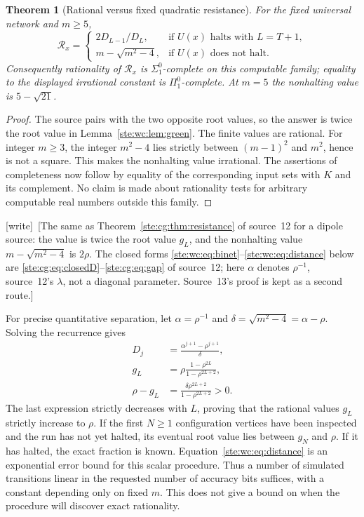 \documentclass[11pt,letterpaper]{article}
\newtheorem{theorem}{Theorem}[section]
\theoremstyle{definition}
\theoremstyle{remark}
\newcommand{\wtag}{\textup{[write]}}
\begin{document}
\begin{theorem}[Rational versus fixed quadratic resistance]
\label{ste:wc:thm:resistance}
For the fixed universal network and $m\geq5$,
\begin{equation}\label{ste:wc:eq:resistance}
 \mathcal R_x=
 \begin{cases}
  2D_{L-1}/D_L,&\text{if }U(x)\text{ halts with }L=T+1,\\
  m-\sqrt{m^2-4},&\text{if }U(x)\text{ does not halt}.
 \end{cases}
\end{equation}
Consequently rationality of $\mathcal R_x$ is $\Sigma^0_1$-complete on this
computable family; equality to the displayed irrational constant is
$\Pi^0_1$-complete. At $m=5$ the nonhalting value is $5-\sqrt{21}$.
\end{theorem}
\begin{proof}
The source pairs with the two opposite root values, so the answer is twice
the root value in Lemma~\ref{ste:wc:lem:green}. The finite values are rational. For
integer $m\geq3$, the integer $m^2-4$ lies strictly between $(m-1)^2$ and
$m^2$, hence is not a square. This makes the nonhalting value irrational.
The assertions of completeness now follow by equality of the corresponding
input sets with $K$ and its complement. No claim is made about rationality
tests for arbitrary computable real numbers outside this family.
\end{proof}

\wtag\ [The same as Theorem~\ref{ste:cg:thm:resistance} of source~12 for a dipole source: the value is twice the root value $g_L$, and the nonhalting value $m-\sqrt{m^2-4}$ is $2\rho$. The closed forms \eqref{ste:wc:eq:binet}--\eqref{ste:wc:eq:distance} below are \eqref{ste:cg:eq:closedD}--\eqref{ste:cg:eq:gap} of source~12; here $\alpha$ denotes $\rho^{-1}$, source~12's $\lambda$, not a diagonal parameter. Source~13's proof is kept as a second route.]


For precise quantitative separation, let $\alpha=\rho^{-1}$ and
$\delta=\sqrt{m^2-4}=\alpha-\rho$. Solving the recurrence gives
\begin{align}
 D_j&=\frac{\alpha^{j+1}-\rho^{j+1}}{\delta},\label{ste:wc:eq:binet}\\
 g_L&=\rho\frac{1-\rho^{2L}}{1-\rho^{2L+2}},\label{ste:wc:eq:gclosed}\\
 \rho-g_L&=\frac{\delta\rho^{2L+2}}{1-\rho^{2L+2}}>0.
 \label{ste:wc:eq:distance}
\end{align}
The last expression strictly decreases with $L$, proving that the rational
values $g_L$ strictly increase to $\rho$. If the first $N\geq1$ configuration
vertices have been inspected and the run has not yet halted, its eventual
root value lies between $g_N$ and $\rho$. If it has halted, the exact
fraction is known. Equation~\eqref{ste:wc:eq:distance} is an exponential error
bound for this scalar procedure. Thus a number of simulated transitions
linear in the requested number of accuracy bits suffices, with a constant
depending only on fixed $m$. This does not give a bound on when the
procedure will discover exact rationality.
\end{document}
